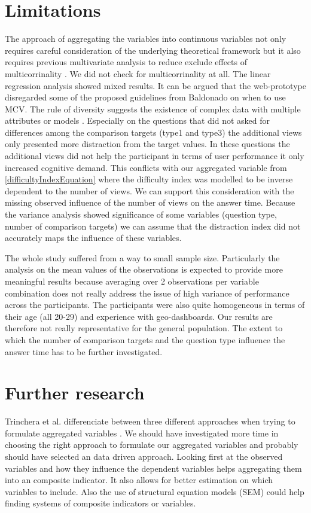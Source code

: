 \section{Limitations}
The approach of aggregating the variables into continuous variables not only requires careful consideration of the underlying theoretical framework
but it also requires previous multivariate analysis to reduce exclude effects of multicorrinality \citep*{MichelaNardo.2005}. We did not check for multicorrinality
at all. The linear regression analysis showed mixed results.
It can be argued that the web-prototype disregarded some of the proposed guidelines from Baldonado on when to use MCV. The rule of diversity
suggests the existence of complex data with multiple attributes or models \citep*{WangBaldonado.2000}. Especially on the questions that did not asked for differences among
the comparison targets (type1 and type3) the additional views only presented more distraction from the target values. In these questions the additional views did not
help the participant in terms of user performance it only increased cognitive demand. This conflicts with our aggregated variable from \ref{difficultyIndexEquation} where
the difficulty index was modelled to be inverse dependent to the number of views. We can support this consideration with the missing observed influence of the number of views
on the answer time. 
Because the variance analysis showed significance of some variables (question type, number of comparison targets)
we can assume that the distraction index did not accurately maps the influence of these variables. 

The whole study suffered from a way to small sample size. Particularly the analysis on the mean values of the observations is expected to provide more meaningful
results because averaging over 2 observations per variable combination does not really address the issue of high variance of performance across the participants.
The participants were also quite homogeneous in terms of their age (all 20-29) and experience with geo-dashboards. Our results are therefore not really representative
for the general population. The extent to which the number of comparison targets and the question type influence the answer time has to be further investigated.


\section{Further research}
Trinchera et al. differenciate between three different approaches when trying to formulate aggregated variables \citep*{Trinchera.2008}. We should have
investigated more time in choosing the right approach to formulate our aggregated variables and probably should have selected an data driven approach. Looking first at 
the observed variables and how they influence the dependent variables helps aggregating them into an composite indicator. It also allows for better estimation on which
variables to include. Also the use of structural equation models (SEM) could help finding systems of composite indicators or variables.

